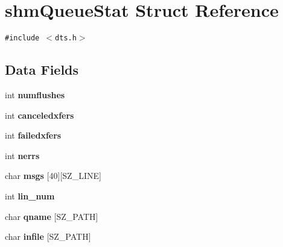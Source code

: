 \hypertarget{structshmQueueStat}{
\section{shmQueueStat Struct Reference}
\label{structshmQueueStat}
}
{\tt \#include $<$dts.h$>$}

\subsection*{Data Fields}
\begin{CompactItemize}
\item 
\hypertarget{structshmQueueStat_2b0824d0334fefbdcc78c5adaba859ef}{
int \textbf{numflushes}}
\label{structshmQueueStat_2b0824d0334fefbdcc78c5adaba859ef}

\item 
\hypertarget{structshmQueueStat_459d10f4ebcebfc3cb77b3115f62735e}{
int \textbf{canceledxfers}}
\label{structshmQueueStat_459d10f4ebcebfc3cb77b3115f62735e}

\item 
\hypertarget{structshmQueueStat_ab51186571b49d35cec97fa9283f99b1}{
int \textbf{failedxfers}}
\label{structshmQueueStat_ab51186571b49d35cec97fa9283f99b1}

\item 
\hypertarget{structshmQueueStat_fc690317e0f9a13989cd90ddbdbd2dc5}{
int \textbf{nerrs}}
\label{structshmQueueStat_fc690317e0f9a13989cd90ddbdbd2dc5}

\item 
\hypertarget{structshmQueueStat_0ab08a39a58246e95d4fc7ce8ef89fcc}{
char \textbf{msgs} \mbox{[}40\mbox{]}\mbox{[}SZ\_\-LINE\mbox{]}}
\label{structshmQueueStat_0ab08a39a58246e95d4fc7ce8ef89fcc}

\item 
\hypertarget{structshmQueueStat_093b729fce8579879a515263a31ff120}{
int \textbf{lin\_\-num}}
\label{structshmQueueStat_093b729fce8579879a515263a31ff120}

\item 
\hypertarget{structshmQueueStat_7d8240910a7d9ac96c5e99867ba88ec3}{
char \textbf{qname} \mbox{[}SZ\_\-PATH\mbox{]}}
\label{structshmQueueStat_7d8240910a7d9ac96c5e99867ba88ec3}

\item 
\hypertarget{structshmQueueStat_55299ce95951fbe3acdb2abacdc855eb}{
char \textbf{infile} \mbox{[}SZ\_\-PATH\mbox{]}}
\label{structshmQueueStat_55299ce95951fbe3acdb2abacdc855eb}


\end{CompactItemize}
